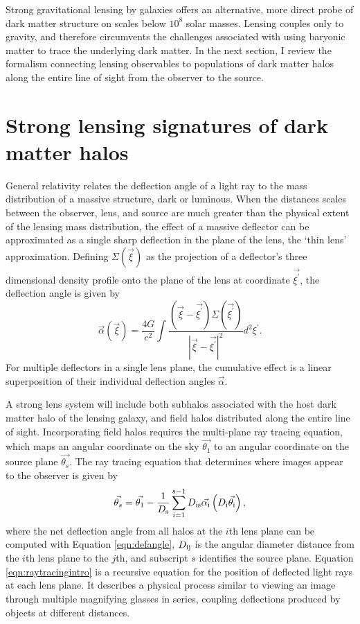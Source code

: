 Strong gravitational lensing by galaxies offers an alternative, more direct probe of dark matter structure on scales below $10^8$ solar masses. Lensing couples only to gravity, and therefore circumvents the challenges associated with using baryonic matter to trace the underlying dark matter. In the next section, I review the formalism connecting lensing observables to populations of dark matter halos along the entire line of sight from the observer to the source. 

\section{Strong lensing signatures of dark matter halos}
\indent General relativity relates the deflection angle of a light ray to the mass distribution of a massive structure, dark or luminous. When the distances scales between the observer, lens, and source are much greater than the physical extent of the lensing mass distribution, the effect of a massive deflector can be approximated as a single sharp deflection in the plane of the lens, the `thin lens' approximation. Defining $\Sigma\left(\vec{\xi}\right)$ as the projection of a deflector's three dimensional density profile onto the plane of the lens at coordinate $\vec{\xi^{\prime}}$, the deflection angle is given by \citep{BlandfordNarayan86}
\begin{equation}
\label{eqn:defangle}
\vec{\alpha}\left(\vec{\xi}\right) = \frac{4G }{c^2} \int \frac{\left(\vec{\xi} - \vec{\xi^{\prime}}\right) \Sigma\left(\vec{\xi^{\prime}}\right)}{| \vec{\xi} - \vec{\xi^{\prime}}|^2} d^2 \xi^{\prime}. 
\end{equation}
For multiple deflectors in a single lens plane, the cumulative effect is a linear superposition of their individual deflection angles $\vec{\alpha}$. 

A strong lens system will include both subhalos associated with the host dark matter halo of the lensing galaxy, and field halos distributed along the entire line of sight. Incorporating field halos requires the multi-plane ray tracing equation, which maps an angular coordinate on the sky $\vec{\theta_1}$ to an angular coordinate on the source plane $\vec{\theta_s}$. The ray tracing equation that determines where images appear to the observer is given by \citep{BlandfordNarayan86}
\begin{equation}
\label{eqn:raytracingintro}
\vec{\theta_s} = \vec{\theta_1} - \frac{1}{D_{\rm{s}}} \sum_{i=1}^{s-1} D_{\rm{is}}{\vec{\alpha_{\rm{i}}}} \left(D_{\rm{i}} \vec{\theta_{\rm{i}}}\right),
\end{equation} 
where the net deflection angle from all halos at the $i$th lens plane can be computed with Equation \ref{eqn:defangle}, $D_{\rm{ij}}$ is the angular diameter distance from the $i$th lens plane to the $j$th, and subscript $s$ identifies the source plane. Equation \ref{eqn:raytracingintro} is a recursive equation for the position of deflected light rays at each lens plane. It describes a physical process similar to viewing an image through multiple magnifying glasses in series, coupling deflections produced by objects at different distances. 

